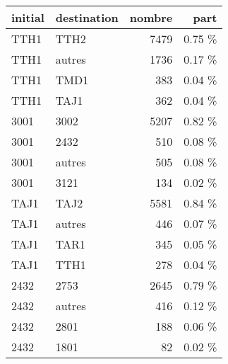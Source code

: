 \begin{tabular}{llrr}
\toprule
initial & destination &  nombre &   part \\
\midrule
   TTH1 &        TTH2 &    7479 & 0.75 \% \\
   TTH1 &      autres &    1736 & 0.17 \% \\
   TTH1 &        TMD1 &     383 & 0.04 \% \\
   TTH1 &        TAJ1 &     362 & 0.04 \% \\
   3001 &        3002 &    5207 & 0.82 \% \\
   3001 &        2432 &     510 & 0.08 \% \\
   3001 &      autres &     505 & 0.08 \% \\
   3001 &        3121 &     134 & 0.02 \% \\
   TAJ1 &        TAJ2 &    5581 & 0.84 \% \\
   TAJ1 &      autres &     446 & 0.07 \% \\
   TAJ1 &        TAR1 &     345 & 0.05 \% \\
   TAJ1 &        TTH1 &     278 & 0.04 \% \\
   2432 &        2753 &    2645 & 0.79 \% \\
   2432 &      autres &     416 & 0.12 \% \\
   2432 &        2801 &     188 & 0.06 \% \\
   2432 &        1801 &      82 & 0.02 \% \\
\bottomrule
\end{tabular}
